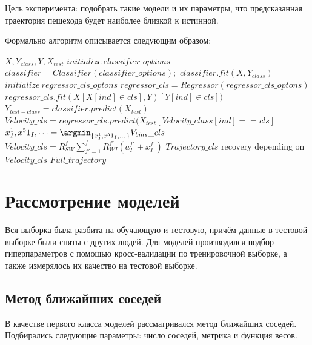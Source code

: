 \documentclass[12pt,twoside]{article}
\begin{document}
Цель эксперимента: подобрать такие модели и их параметры, что предсказанная траектория пешехода будет наиболее близкой к истинной.


Формально алгоритм описывается следующим образом: 

\begin{algorithmic}[1]
    \REQUIRE $X, Y_{class}, Y, X_{test}$
    \STATE $initialize ~ classifier\_options$
    \STATE $classifier = Classifier(classifier\_options);$
    \STATE $classifier.fit(X, Y_{class})$
    \STATE $initialize ~ regressor\_cls\_optons$
    \STATE $regressor\_cls = Regressor(regressor\_cls\_optons)$
    \STATE $regressor\_cls.fit(X[X[ind] \in cls], Y)[Y[ind] \in cls])$
    \ENDFOR
    \STATE $Y_{test-class} = classifier.predict(X_{test})$
    \STATE $Velocity\_cls = regressor\_cls.predict(X_{test}
    [Velocity\_class[ind] == cls]$
    \STATE $x^1_I, x^51_I,\dots = \argmin_{\{x^1_I, x^51_I,\dots\}}V_{bias}\_cls$
    \STATE $Velocity\_cls = R_{SW}^f\sum_{f'=1}^f R_{WI}^{f'}(a_I^{f'}+x_I^{f'})$
    \STATE $Trajectory\_cls$ recovery depending on $Velocity\_cls$
    \ENDFOR
    \RETURN $Full\_trajectory$
\end{algorithmic}

\section{Рассмотрение моделей}

Вся выборка была разбита на обучающую и тестовую, причём данные в тестовой выборке были сняты с других людей.
Для моделей производился подбор гиперпараметров с помощью кросс-валидации по тренировочной выборке, а также измерялось их качество на тестовой выборке.

\subsection{Метод ближайших соседей}
В качестве первого класса моделей рассматривался метод ближайших соседей. Подбирались следующие параметры: число соседей, метрика и функция весов.
\end{document}
